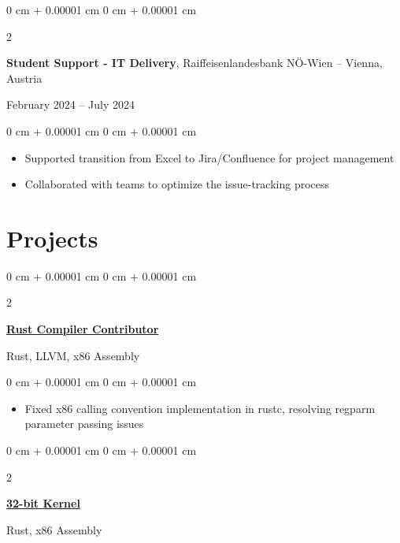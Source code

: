 \documentclass[10pt, letterpaper]{article}
\newenvironment{highlights}{
    \begin{itemize}[
        topsep=0.10 cm,
        parsep=0.10 cm,
        partopsep=0pt,
        itemsep=0pt,
        leftmargin=0 cm + 10pt
    ]
}{
    \end{itemize}
}
\newenvironment{onecolentry}{
    \begin{adjustwidth}{
        0 cm + 0.00001 cm
    }{
        0 cm + 0.00001 cm
    }
}{
    \end{adjustwidth}
}
\newenvironment{twocolentry}[2][]{
    \onecolentry
    \def\secondColumn{#2}
    \setcolumnwidth{\fill, 4.5 cm}
    \begin{paracol}{2}
}{
    \switchcolumn \raggedleft \secondColumn
    \end{paracol}
    \endonecolentry
}
\begin{document}
    \vspace{0.2 cm}

    \begin{twocolentry}
        {February 2024 – July 2024}
        \textbf{Student Support - IT Delivery}, Raiffeisenlandesbank NÖ-Wien -- Vienna, Austria
    \end{twocolentry}

    \vspace{0.10 cm}

    \begin{onecolentry}
        \begin{highlights}
            \item Supported transition from Excel to Jira/Confluence for project management
            \item Collaborated with teams to optimize the issue-tracking process
        \end{highlights}
    \end{onecolentry}

    \section{Projects}

    \begin{twocolentry}
        {Rust, LLVM, x86 Assembly}
        \href{https://github.com/rust-lang/rust/}{\textbf{Rust Compiler Contributor}}
    \end{twocolentry}

    \vspace{0.10 cm}
    
    \begin{onecolentry}
        \begin{highlights}
            \item Fixed x86 calling convention implementation in rustc, resolving regparm parameter passing issues
        \end{highlights}
    \end{onecolentry}

    \vspace{0.2 cm}


    \begin{twocolentry}
        {Rust, x86 Assembly}
        \href{https://github.com/kentucky-fried-kernel/kfs}{\textbf{32-bit Kernel}}
    \end{twocolentry}

    \vspace{0.10 cm}
    
\end{document}
